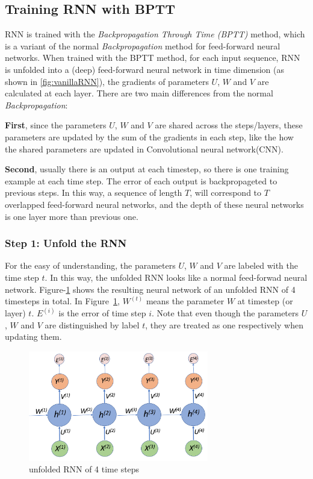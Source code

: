 \documentclass[english]{article}
\begin{document}
\subsection{Training RNN with BPTT}\label{sec:train-rnn}
RNN is trained with the \textit{Backpropagation Through Time (BPTT)} method, which is a variant of the normal \textit{Backpropagation} method for  feed-forward neural networks. When trained with the BPTT method, for each input sequence, RNN is unfolded into a (deep) feed-forward neural network in time dimension (as shown in \ref{fig:vanillaRNN}), the gradients of parameters $U$, $W$ and $V$ are calculated at each layer. 
There are two main differences from the normal \textit{Backpropagation}:  \par
 \textbf{First}, since the parameters $U$, $W$ and $V$ are shared across the steps/layers, these parameters are updated by the sum of the gradients in each step, like the how the shared parameters are updated in Convolutional neural network(CNN). \par
 \textbf{Second}, usually there is an output at each timestep,  so there is one training example at each time step.
 The error of each output is backpropageted to previous steps. In this way, a sequence of  length $T$, will correspond to $T$ overlapped feed-forward neural networks, and the depth of these neural networks is one layer more than previous one.


\subsubsection{Step 1: Unfold the RNN}
For the easy of understanding, the parameters $U$, $W$ and $V$  are labeled with the time step $t$.  In this way, the unfolded RNN looks like a normal
feed-forwad neural network. Figure-\ref{fig:rnn4} shows the resulting neural network of an unfolded RNN of 4 timesteps in total. 
In Figure~\ref{fig:rnn4}, $W^{(t)}$ means the parameter $W$ at timestep (or layer) $t$. $E^{(i)}$ is the error of time step $i$.  Note that even though the parameters $U$, $W$ and $V$  are distinguished by label $t$,  they are treated as one respectively when updating them.

\begin{figure}[htbp]
	\centering
	\includegraphics[width=0.7\textwidth]{unfold-rnn}
	\caption{unfolded RNN of 4 time steps}
	\label{fig:rnn4}
\end{figure}
\end{document}
